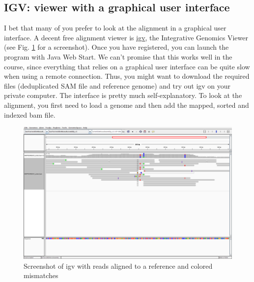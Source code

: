 \documentclass[11pt]{article}
\begin{document}
\subsection{IGV: viewer with a graphical user interface}
\label{sec:orgheadline8}
I bet that many of you prefer to look at the alignment in a graphical
user interface. A decent free alignment viewer is \href{https://www.broadinstitute.org/igv/}{igv}, the Integrative
Genomics Viewer (see Fig. \ref{fig:orgparagraph2} for a screenshot). Once you have
registered, you can launch the program with Java Web Start. We can't
promise that this works well in the course, since everything that
relies on a graphical user interface can be quite slow when using a
remote connection. Thus, you might want to download the required files
(deduplicated SAM file and reference genome) and try out igv on your
private computer. The interface is pretty much self-explanatory. To
look at the alignment, you first need to load a genome and then add
the mapped, sorted and indexed bam file.



\begin{figure}[htb]
\centering
\includegraphics[width=17cm]{igv.png}
\caption{\label{fig:orgparagraph2}
Screenshot of igv with reads aligned to a reference and colored mismatches}
\end{figure}

\clearpage
\end{document}
